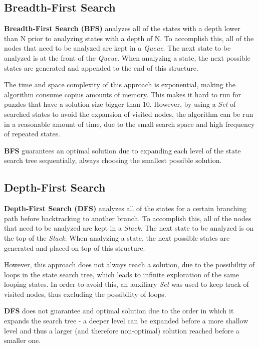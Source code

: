\documentclass[conference]{IEEEtran}
\begin{document}
\subsection{Breadth-First Search}

\textbf{Breadth-First Search (BFS)} analyzes all of the states with a depth lower than N prior to analyzing states with a depth of N. To accomplish this, all of the nodes that need to be analyzed are kept in a \textit{Queue}. The next state to be analyzed is at the front of the \textit{Queue}. When analyzing a state, the next possible states are generated and appended to the end of this structure.

The time and space complexity of this approach is exponential, making the algorithm consume copius amounts of memory. This makes it hard to run for puzzles that have a solution size bigger than 10. However, by using a \textit{Set} of searched states to avoid the expansion of visited nodes, the algorithm can be run in a reasonable amount of time, due to the small search space and high frequency of repeated states.

\textbf{BFS} guarantees an optimal solution due to expanding each level of the state search tree sequentially, always choosing the smallest possible solution.

\subsection{Depth-First Search}

\textbf{Depth-First Search (DFS)} analyzes all of the states for a certain branching path before backtracking to another branch. To accomplish this, all of the nodes that need to be analyzed are kept in a \textit{Stack}. The next state to be analyzed is on the top of the \textit{Stack}. When analyzing a state, the next possible states are generated and placed on top of this structure.

However, this approach does not always reach a solution, due to the possibility of loops in the state search tree, which leads to infinite exploration of the same looping states.
In order to avoid this, an auxiliary \textit{Set} was used to keep track of visited nodes, thus excluding the possibility of loops.

\textbf{DFS} does not guarantee and optimal solution due to the order in which it expands the search tree - a deeper level can be expanded before a more shallow level and thus a larger (and therefore non-optimal) solution reached before a smaller one.
\end{document}

